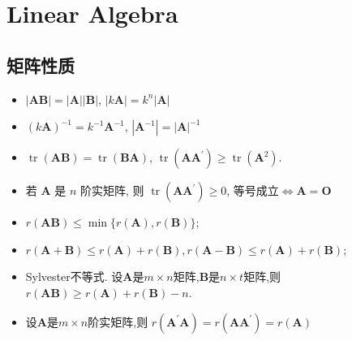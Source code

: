\documentclass[UTF8]{ctexart}
\begin{document}
\section{Linear Algebra}

\subsection{矩阵性质}

\begin{itemize}

	\item $|\boldsymbol{A B}|=|\boldsymbol{A}||\boldsymbol{B}|$, $|k\boldsymbol{A}|=k^n|\boldsymbol{A}|$

	\item $(k \boldsymbol{A})^{-1}=k^{-1} \boldsymbol{A}^{-1}$, $|\boldsymbol{A}^{-1}|=|\boldsymbol{A}|^{-1}$

	\item $\operatorname{tr}(\boldsymbol{A} \boldsymbol{B})=
		      \operatorname{tr}(\boldsymbol{B} \boldsymbol{A})$,
	      $\operatorname{tr}\left(\boldsymbol{A} \boldsymbol{A}^{\prime}\right)
		      \geq \operatorname{tr}\left(\boldsymbol{A}^2 \right)$.

	\item 若 $\boldsymbol{A}$ 是 $n$ 阶实矩阵,
	      则 $\operatorname{tr}\left(\boldsymbol{A} \boldsymbol{A}^{\prime}\right) \geq 0$,
	      等号成立$\Leftrightarrow\boldsymbol{A}=\boldsymbol{O}$\par

	\item $r(\boldsymbol{A} \boldsymbol{B}) \leq \min \{r(\boldsymbol{A}), r(\boldsymbol{B})\}$;\par

	\item $r(\boldsymbol{A}+\boldsymbol{B}) \leq r(\boldsymbol{A})+r(\boldsymbol{B}),
		      r(\boldsymbol{A}-\boldsymbol{B}) \leq r(\boldsymbol{A})+r(\boldsymbol{B})$;\par

	\item Sylvester不等式.
	      设$\boldsymbol{A}$是$m\times n$矩阵,$\boldsymbol{B}$是$n\times t$矩阵,则
	      $r(\boldsymbol{A} \boldsymbol{B}) \geq r(\boldsymbol{A})+r(\boldsymbol{B})-n$.

	\item 设$\boldsymbol{A}$是$m\times n$阶实矩阵,则
	      $r\left(\boldsymbol{A}^{\prime} \boldsymbol{A}\right)=
		      r\left(\boldsymbol{A} \boldsymbol{A}^{\prime}\right)=r(\boldsymbol{A})$


\end{itemize}
\end{document}
